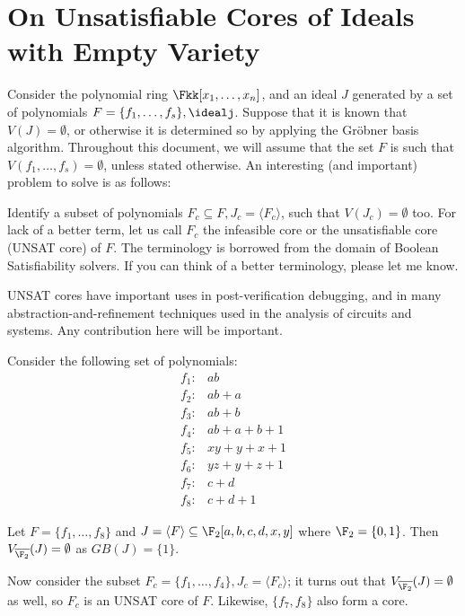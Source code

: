 \section{On Unsatisfiable Cores of Ideals with Empty Variety}

Consider the polynomial ring $\Fkk[x_1, \dots, x_n]$, and an ideal $J$
generated by a set of polynomials $F = \{f_1, \dots, f_s\},
\idealj$. Suppose that it is known that $V(J) = \emptyset$, or
otherwise it is determined so by applying the Gr\"obner basis
algorithm. Throughout this document, we will assume that the set $F$
is such that $V(f_1, \dots, f_s) = \emptyset$, unless stated
otherwise. An interesting (and important) problem to solve is as
follows:   

\begin{Problem}
Identify a subset of polynomials $F_c \subseteq F, J_c = \langle F_c
\rangle$, such that $V(J_c) = \emptyset$ too. For lack of a better
term, let us call $F_c$ the infeasible core or the unsatisfiable
core (UNSAT core) of $F$. The terminology is borrowed from the domain of
Boolean Satisfiability solvers. If you can think of a better
terminology, please let me know. 
\end{Problem}

UNSAT cores have important uses in post-verification debugging, and in
many abstraction-and-refinement techniques used in the analysis of
circuits and systems. Any contribution here will be important. 

\begin{Example}\label{ex1}
Consider the following set of polynomials:
\begin{align*}
f_1: & ab\\
f_2: & ab+a\\
f_3: & ab+b\\
f_4: & ab+a+b+1\\
f_5: & xy+y+x+1\\
f_6: & yz+y+z+1\\
f_7: & c + d\\
f_8: & c + d + 1
\end{align*}

Let $F = \{f_1, \dots, f_8\}$ and $J = \langle F \rangle \subseteq
\F_2[a, b, c, d, x, y]$ where $\F_2 = \{0, 1\}$. Then
$V_{\overline{\F_2}}(J) = \emptyset$ as $GB(J) = \{1\}$. 

Now consider the subset $F_c = \{f_1, \dots, f_4\}, J_c = \langle
F_c\rangle$; it turns out that $V_{\overline{\F_2}}(J)= \emptyset$ as
well, so $F_c$ is an UNSAT core of $F$. Likewise, $\{f_7, f_8\}$ also
form a core. 
\end{Example}


